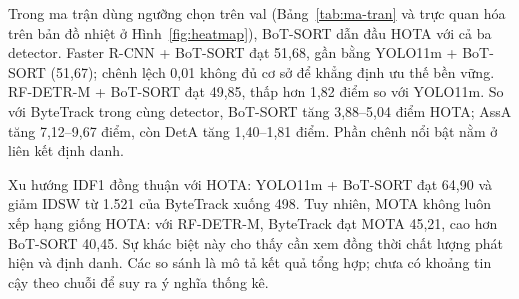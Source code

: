 \documentclass[fontsize=13pt,a4paper,oneside,parskip=false,numbers=noenddot,bibliography=totoc]{scrreprt}
\begin{document}
Trong ma trận dùng ngưỡng chọn trên val (Bảng~\ref{tab:ma-tran} và trực quan hóa trên bản đồ nhiệt ở Hình~\ref{fig:heatmap}), BoT-SORT dẫn đầu HOTA với cả ba detector. Faster R-CNN + BoT-SORT đạt 51,68, gần bằng YOLO11m + BoT-SORT (51,67); chênh lệch 0,01 không đủ cơ sở để khẳng định ưu thế bền vững. RF-DETR-M + BoT-SORT đạt 49,85, thấp hơn 1,82 điểm so với YOLO11m. So với ByteTrack trong cùng detector, BoT-SORT tăng 3,88--5,04 điểm HOTA; AssA tăng 7,12--9,67 điểm, còn DetA tăng 1,40--1,81 điểm. Phần chênh nổi bật nằm ở liên kết định danh.

Xu hướng IDF1 đồng thuận với HOTA: YOLO11m + BoT-SORT đạt 64,90 và giảm IDSW từ 1.521 của ByteTrack xuống 498. Tuy nhiên, MOTA không luôn xếp hạng giống HOTA: với RF-DETR-M, ByteTrack đạt MOTA 45,21, cao hơn BoT-SORT 40,45. Sự khác biệt này cho thấy cần xem đồng thời chất lượng phát hiện và định danh. Các so sánh là mô tả kết quả tổng hợp; chưa có khoảng tin cậy theo chuỗi để suy ra ý nghĩa thống kê.
\end{document}
